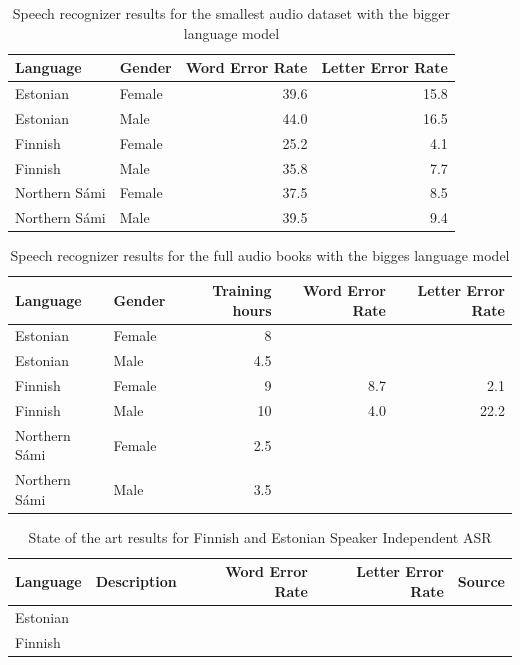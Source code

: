 \documentclass[b5paper]{article}
\newcommand{\ns}{{Northern Sámi }}
\begin{document}
\begin{table}[!h]
\centering
\begin{tabular}{llrr}
\textbf{Language} & \textbf{Gender} & \textbf{Word Error Rate} & \textbf{Letter Error Rate}\\\hline
Estonian & Female & 39.6 & 15.8 \\
Estonian & Male & 44.0 & 16.5\\
Finnish & Female & 25.2 &4.1 \\
Finnish & Male &  35.8 & 7.7 \\
\ns & Female & 37.5 & 8.5 \\
\ns & Male & 39.5 & 9.4 \\
\end{tabular}
\caption{Speech recognizer results for the smallest audio dataset with the bigger language model \label{tbl:resultssmallcomp}}
\end{table}


\begin{table}[!h]
\centering
\begin{tabular}{llrrr}
\textbf{Language} & \textbf{Gender} & \textbf{Training hours} & \textbf{Word Error Rate} & \textbf{Letter Error Rate}\\\hline
Estonian & Female & 8 &  &  \\
Estonian & Male & 4.5 & & \\
Finnish & Female & 9  & 8.7 & 2.1 \\
Finnish & Male & 10  & 4.0 & 22.2  \\
\ns & Female & 2.5  & &  \\
\ns & Male & 3.5   & &  \\
\end{tabular}
\caption{Speech recognizer results for the full audio books with the bigges language model \label{tbl:resultbigcomp}}
\end{table}



\begin{table}[!h]
\centering
\begin{tabular}{llrrl}
\textbf{Language} & \textbf{Description} & \textbf{Word Error Rate} & \textbf{Letter Error Rate} & \textbf{Source}\\\hline
Estonian &  & & &  \\
Finnish &  & & &  \\
\end{tabular}
\caption{State of the art results for Finnish and Estonian Speaker Independent ASR}
\end{table}
\end{document}
